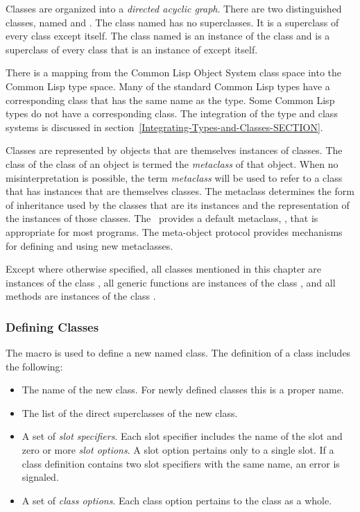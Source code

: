 Classes are organized into a \emph{directed acyclic graph}.  There are
two distinguished classes, named  and .
The class named  has no superclasses.  It is a superclass of
every class except itself.  The class named  is
an instance of the class  and is a superclass of
every class that is an instance of  except itself.

There is a mapping from the Common Lisp Object System class space into
the Common Lisp type space.  Many of the standard Common Lisp types
have a corresponding
class that has the same name as the type.  Some Common Lisp types do
not have a corresponding class.  The integration of the type and class
systems is discussed in section~\ref{Integrating-Types-and-Classes-SECTION}.

Classes are represented by objects that are themselves
instances of classes.  The class of the class of an object is termed
the \emph{metaclass} of that object.  When no misinterpretation is
possible, the term \emph{metaclass} will be used to refer to a class
that has instances that are themselves classes.  The metaclass
determines the form of inheritance used by the classes that are its
instances and the representation of the instances of those classes.
The \CLOS\ provides a default metaclass, , that is
appropriate for most programs.  The meta-object protocol provides
mechanisms for defining and using new metaclasses.

Except where otherwise specified, all classes mentioned in this
chapter are instances of the class , all generic
functions are instances of the class ,
and all methods are instances of the class .

\subsubsection{Defining Classes}

The macro  is used to define a new named class.
The definition of a class includes the following:

\begin{itemize}

\item  The name of the new class. For newly defined classes
this is a proper name.

\item  The list of the direct superclasses of the new class. 

\item  A set of \emph{slot specifiers}.  Each slot specifier
includes the name of the slot and zero or more \emph{slot options}.  A
slot option pertains only to a single slot. If a class definition
contains two slot specifiers with the same name, an error is signaled.

\item  A set of \emph{class options}.  Each class option pertains 
to the class as a whole.
\end{itemize}

